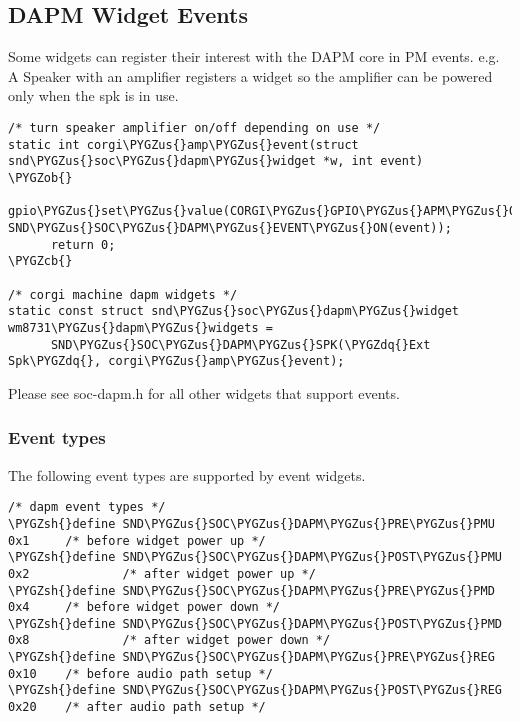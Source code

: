 \documentclass[a4paper,8pt,english]{sphinxmanual}
\def\PYGZus{\char`\_}
\def\PYGZob{\char`\{}
\def\PYGZcb{\char`\}}
\def\PYGZsh{\char`\#}
\def\PYGZdq{\char`\"}
\begin{document}
\subsection{DAPM Widget Events}
\label{sound/soc/dapm:dapm-widget-events}
Some widgets can register their interest with the DAPM core in PM events.
e.g. A Speaker with an amplifier registers a widget so the amplifier can be
powered only when the spk is in use.

\begin{Verbatim}[commandchars=\\\{\}]
/* turn speaker amplifier on/off depending on use */
static int corgi\PYGZus{}amp\PYGZus{}event(struct snd\PYGZus{}soc\PYGZus{}dapm\PYGZus{}widget *w, int event)
\PYGZob{}
      gpio\PYGZus{}set\PYGZus{}value(CORGI\PYGZus{}GPIO\PYGZus{}APM\PYGZus{}ON, SND\PYGZus{}SOC\PYGZus{}DAPM\PYGZus{}EVENT\PYGZus{}ON(event));
      return 0;
\PYGZcb{}

/* corgi machine dapm widgets */
static const struct snd\PYGZus{}soc\PYGZus{}dapm\PYGZus{}widget wm8731\PYGZus{}dapm\PYGZus{}widgets =
      SND\PYGZus{}SOC\PYGZus{}DAPM\PYGZus{}SPK(\PYGZdq{}Ext Spk\PYGZdq{}, corgi\PYGZus{}amp\PYGZus{}event);
\end{Verbatim}

Please see soc-dapm.h for all other widgets that support events.


\subsubsection{Event types}
\label{sound/soc/dapm:event-types}
The following event types are supported by event widgets.

\begin{Verbatim}[commandchars=\\\{\}]
/* dapm event types */
\PYGZsh{}define SND\PYGZus{}SOC\PYGZus{}DAPM\PYGZus{}PRE\PYGZus{}PMU  0x1     /* before widget power up */
\PYGZsh{}define SND\PYGZus{}SOC\PYGZus{}DAPM\PYGZus{}POST\PYGZus{}PMU 0x2             /* after widget power up */
\PYGZsh{}define SND\PYGZus{}SOC\PYGZus{}DAPM\PYGZus{}PRE\PYGZus{}PMD  0x4     /* before widget power down */
\PYGZsh{}define SND\PYGZus{}SOC\PYGZus{}DAPM\PYGZus{}POST\PYGZus{}PMD 0x8             /* after widget power down */
\PYGZsh{}define SND\PYGZus{}SOC\PYGZus{}DAPM\PYGZus{}PRE\PYGZus{}REG  0x10    /* before audio path setup */
\PYGZsh{}define SND\PYGZus{}SOC\PYGZus{}DAPM\PYGZus{}POST\PYGZus{}REG 0x20    /* after audio path setup */
\end{Verbatim}
\end{document}
